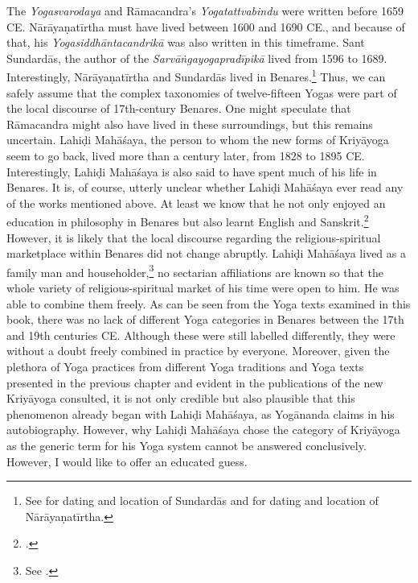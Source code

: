 The \textit{Yogasvarodaya} and Rāmacandra's \textit{Yogatattvabindu} were written before 1659 CE. Nārāyaṇatīrtha must have lived between 1600 and 1690 CE., and because of that, his \textit{Yogasiddhāntacandrikā} was also written in this timeframe. Sant Sundardās, the author of the \textit{Sarvāṅgayogapradīpikā} lived from 1596 to 1689. Interestingly, Nārāyaṇatīrtha and Sundardās lived in Benares.\footnote{See \citeauthor[2014: 684]{burger2014sarvangayogapradipika} for dating and location of Sundardās and \citeauthor[2004: 24]{penna2004} for dating and location of Nārāyaṇatīrtha.} Thus, we can safely assume that the complex taxonomies of twelve-fifteen Yogas were part of the local discourse of 17th-century Benares. One might speculate that Rāmacandra might also have lived in these surroundings, but this remains uncertain. Lahiḍi Mahāśaya, the person to whom the new forms of Kriyāyoga seem to go back, lived more than a century later, from 1828 to 1895 CE. Interestingly, Lahiḍi Mahāśaya is also said to have spent much of his life in Benares. It is, of course, utterly unclear whether Lahiḍi Mahāśaya ever read any of the works mentioned above. At least we know that he not only enjoyed an education in philosophy in Benares but also learnt English and Sanskrit.\footnote{\citeauthor[2008: 255-256]{jones2008encyclopedia}.} However, it is likely that the local discourse regarding the religious-spiritual marketplace within Benares did not change abruptly. Lahiḍi Mahāśaya lived as a family man and householder,\footnote{See \citeauthor[1946: ch. 34,35]{autobioyogi}.} no sectarian affiliations are known so that the whole variety of religious-spiritual market of his time were open to him. He was able to combine them freely. As can be seen from the Yoga texts examined in this book, there was no lack of different Yoga categories in Benares between the 17th and 19th centuries CE. Although these were still labelled differently, they were without a doubt freely combined in practice by everyone. Moreover, given the plethora of Yoga practices from different Yoga traditions and Yoga texts presented in the previous chapter and evident in the publications of the new Kriyāyoga consulted, it is not only credible but also plausible that this phenomenon already began with Lahiḍi Mahāśaya, as Yogānanda claims in his autobiography. However, why Lahiḍi Mahāśaya chose the category of Kriyāyoga as the generic term for his Yoga system cannot be answered conclusively. However, I would like to offer an educated guess.

